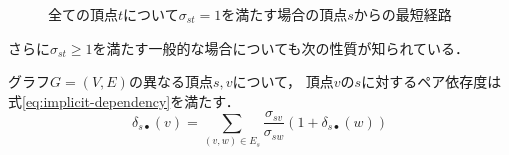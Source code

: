 \begin{figure}[tb]
  \centering
  \def\svgwidth{.35\linewidth}
  
  \caption{全ての頂点$t$について$\sigma_{st}=1$を満たす場合の頂点$s$からの最短経路}
  \label{fig:implicit-dependency-1}
\end{figure}

さらに$\sigma_{st}\geq 1$を満たす一般的な場合についても次の性質が知られている．

\begin{theorem}
  \label{th:implicit-dependency}
  グラフ$G=(V,E)$の異なる頂点$s,v$について，
  頂点$v$の$s$に対するペア依存度は式\eqref{eq:implicit-dependency}を満たす．
  \begin{equation}
    \label{eq:implicit-dependency}
    \delta_{s\bullet}(v)=\sum_{(v,w)\in E_s}\frac{\sigma_{sv}}{\sigma_{sw}}(1+\delta_{s\bullet}(w))
  \end{equation}
\end{theorem}
